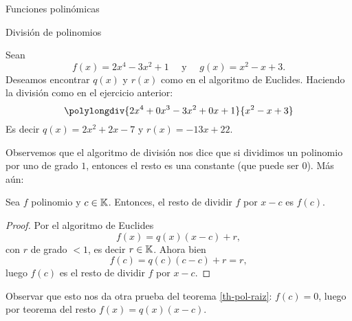 \begin{chapter}{Funciones polinómicas}
\begin{section}{División de polinomios}
    \begin{ejemplo*}
        Sean
        \begin{equation*}
            f (x) = 2x^4 - 3x^2 + 1 \quad \text{ y } \quad g (x) = x^2 - x + 3.
        \end{equation*}
        Deseamos encontrar $q (x)$ y $r (x)$ como en el algoritmo de Euclides. Haciendo la división como en el ejercicio anterior:
        \begin{equation*}
            \polylongdiv{2x^4 +0x^3- 3x^2 +0x+ 1}{x^2 - x + 3}
        \end{equation*}
        Es decir $q(x) = 2x^2+2x-7$ y $r(x)= -13x+22$.
    \end{ejemplo*}

    Observemos que el algoritmo de división nos dice que si dividimos un polinomio por uno de grado $1$,  entonces el resto es una constante (que puede ser $0$). Más aún:

    \begin{teorema} Sea $f$ polinomio y $c \in \mathbb K$. Entonces,  el resto de dividir $f$ por $x-c$ es $f(c)$.
    \end{teorema}
    \begin{proof} Por  el algoritmo de Euclides
        \begin{equation*}
            f(x) = q(x)(x-c) + r,
        \end{equation*}
        con $r$ de grado $<1$,  es decir $r \in \mathbb K$.  Ahora bien
        \begin{equation*}
            f(c) = q(c)(c-c) + r = r,
        \end{equation*}
        luego $f(c)$  es el resto de dividir $f$ por $x-c$.
    \end{proof}

    Observar que esto  nos da otra prueba del teorema \ref{th-pol-raiz}: $f(c)=0$, luego por teorema del resto $ f(x)=q(x)(x-c)$.

 \end{section}

\end{chapter}

